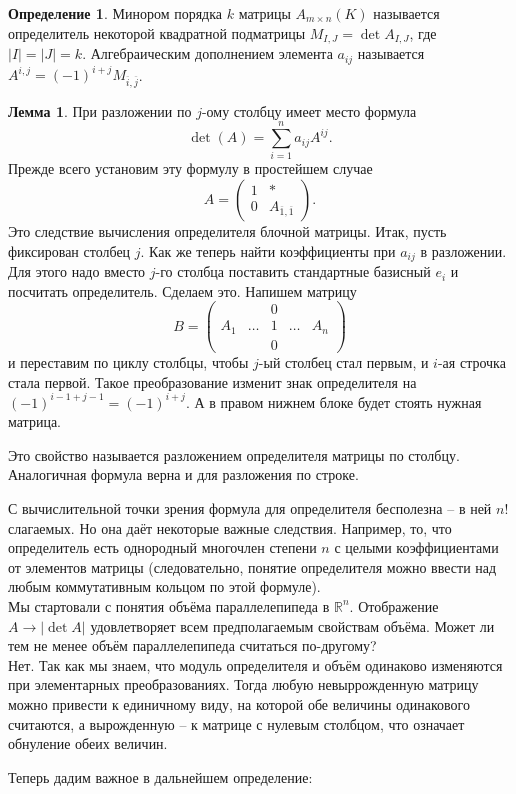 \documentclass[10pt,a4paper,oneside]{book} %
\theoremstyle{definition}
\newtheorem*{defn}{Определение}
\newtheorem{lem}{Лемма}
\newcommand{\mb}[1]{\mathbb{#1}}
\newcommand{\ovl}{\overline}
\def\dfn{\begin{defn}}
\def\edfn{\end{defn}}
\def\lm{\begin{lem}}
\def\elm{\end{lem}}
\def\pmat{\begin{pmatrix}}
\def\epmat{\end{pmatrix}}
\begin{document}
\dfn Минором порядка $k$ матрицы $A_{m\times n}(K)$ называется определитель некоторой квадратной подматрицы $M_{I,J}=\det A_{I,J}$, где $|I|=|J|=k$. Алгебраическим дополнением элемента $a_{ij}$ называется $A^{i,j}=(-1)^{i+j} M_{\ovl{i},\ovl{j}}$.
\edfn






\lm При разложении по $j$-ому столбцу имеет место формула  $$\det(A)=\sum_{i=1}^n a_{ij} A^{ij}.$$
\proof Прежде всего установим эту формулу в простейшем случае $$A=\pmat 1& *\\
0& A_{\ovl{1},\ovl{1}}\epmat. $$
Это следствие вычисления определителя блочной матрицы. Итак, пусть фиксирован столбец $j$. Как же теперь найти коэффициенты при $a_{ij}$ в разложении. Для этого надо вместо $j$-го столбца поставить стандартные базисный $e_i$ и посчитать определитель. Сделаем это. Напишем матрицу
$$B= \pmat
   &       & 0 &      & \\
A_1& \dots & 1 &\dots & A_n \\
   &       & 0 &      & \epmat $$
и переставим по циклу столбцы, чтобы $j$-ый столбец стал первым, и $i$-ая строчка стала первой. Такое преобразование изменит знак определителя на $(-1)^{i-1+j-1}=(-1)^{i+j}$. А в правом нижнем блоке будет стоять нужная матрица.
\endproof
\elm
Это свойство называется разложением  определителя матрицы  по столбцу. Аналогичная формула верна и для разложения по строке.

С вычислительной точки зрения формула для определителя бесполезна -- в ней $n!$ слагаемых. Но она даёт некоторые важные следствия. Например, то, что определитель есть однородный многочлен степени $n$ с целыми коэффициентами от элементов матрицы (следовательно, понятие определителя можно ввести над любым коммутативным кольцом по этой формуле).\\

Мы стартовали с понятия объёма параллелепипеда в $\mb R^n$. Отображение $A \to |\det A|$ удовлетворяет всем предполагаемым свойствам объёма. Может ли тем не менее объём параллелепипеда считаться по-другому? \\
Нет. Так как мы знаем, что модуль определителя и объём одинаково изменяются при элементарных преобразованиях. Тогда любую невыррожденную матрицу можно привести к единичному виду, на которой обе величины одинакового считаются, а вырожденную -- к матрице с нулевым столбцом, что означает обнуление обеих величин.

Теперь дадим важное в дальнейшем определение:
\end{document}
